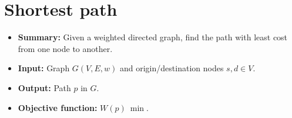 \section{Shortest path} \label{algorithm-shortestpath}
\begin{itemize}
    \item \textbf{Summary:} Given a weighted directed graph, find the path with least cost from one node to another.
    \item \textbf{Input:} Graph $G(V,E,w)$ and origin/destination nodes $s, d \in V$.
    \item \textbf{Output:} Path $p$ in $G$.
    \item \textbf{Objective function:} $W(p)~\min$.
\end{itemize}


